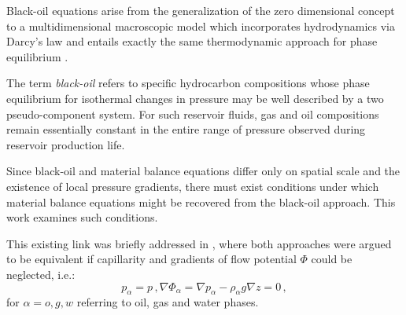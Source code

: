 \documentclass[authoryear,preprint,review,12pt]{elsarticle}
\begin{document}
Black-oil equations arise from the generalization of the zero dimensional concept to a multidimensional macroscopic model which incorporates hydrodynamics via Darcy's law and entails exactly the same thermodynamic approach for phase equilibrium \citep{aziz1979petroleum}.


The term \textit{black-oil} refers to specific hydrocarbon compositions whose phase equilibrium for isothermal changes in pressure may be well described by a two pseudo-component system. For such reservoir fluids, gas and oil compositions remain essentially constant in the entire range of pressure observed during reservoir production life. 


Since black-oil and material balance equations differ only on spatial scale and the existence of local pressure gradients, there must exist conditions under which material balance equations might be recovered from the black-oil approach. This work examines such conditions. 

This existing link was briefly addressed in \cite{ertekin2001basic}, where both approaches were argued to be equivalent if capillarity and gradients of flow potential $\Phi$ could be neglected, i.e.:
\begin{subequations}
\begin{equation}
p_\alpha = p \, ,
\end{equation}
\begin{equation}
\nabla \Phi_\alpha = \nabla p_\alpha - \rho_\alpha g \nabla z = 0 \, ,
\end{equation}
\end{subequations}
for $\alpha=o,g,w$ referring to oil, gas and water phases.

\end{document}
